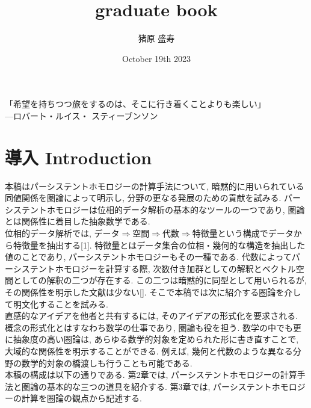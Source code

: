 \documentclass[a4paper]{jsarticle}
\title{graduate book}
\author{猪原 盛寿}
\date{October 19th 2023}
\theoremstyle{definition}
\begin{document}
\Large
\maketitle
「希望を持ちつつ旅をするのは、そこに行き着くことよりも楽しい」\\
---ロバート・ルイス・ スティーブンソン
\section{導入 Introduction}
本稿はパーシステントホモロジーの計算手法について, 暗黙的に用いられている同値関係を圏論によって明示し, 分野の更なる発展のための貢献を試みる. パーシステントホモロジーは位相的データ解析の基本的なツールの一つであり, 圏論とは関係性に着目した抽象数学である.\\

位相的データ解析では, データ$\Rightarrow$空間$\Rightarrow$代数$\Rightarrow$特徴量という構成でデータから特徴量を抽出する[1]. 特徴量とはデータ集合の位相・幾何的な構造を抽出した値のことであり, パーシステントホモロジーもその一種である. 代数によってパーシステントホモロジーを計算する際, 次数付き加群としての解釈とベクトル空間としての解釈の二つが存在する. この二つは暗黙的に同型として用いられるが, その関係性を明示した文献は少ない[]. そこで本稿では次に紹介する圏論を介して明文化することを試みる. \\

直感的なアイデアを他者と共有するには, そのアイデアの形式化を要求される. 概念の形式化とはすなわち数学の仕事であり, 圏論も役を担う. 数学の中でも更に抽象度の高い圏論は, あらゆる数学的対象を定められた形に書き直すことで, 大域的な関係性を明示することができる. 例えば, 幾何と代数のような異なる分野の数学的対象の橋渡しも行うことも可能である. \\

本稿の構成は以下の通りである. 第2章では, パーシステントホモロジーの計算手法と圏論の基本的な三つの道具を紹介する. 第3章では, パーシステントホモロジーの計算を圏論の観点から記述する. 
\end{document}
